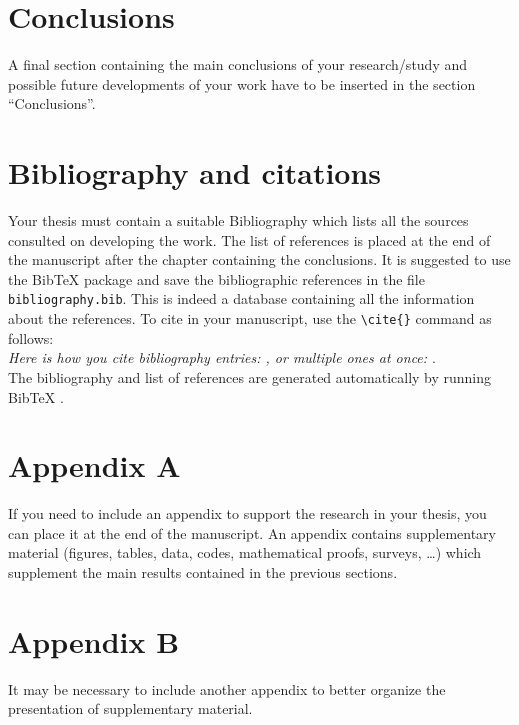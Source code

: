 \documentclass[11pt,a4paper]{article}
\begin{document}
\section{Conclusions}
\color{black}
A final section containing the main conclusions of your research/study
and possible future developments of your work have to be inserted in the section ``Conclusions''.

\section{Bibliography and citations}
Your thesis must contain a suitable Bibliography which lists all the sources consulted on developing the work.
The list of references is placed at the end of the manuscript after the chapter containing the conclusions.
It is suggested to use the BibTeX package and save the bibliographic references in the file \verb|bibliography.bib|.
This is indeed a database containing all the information about the references. To cite in your manuscript, use the \verb|\cite{}| command as follows:
\\
\textit{Here is how you cite bibliography entries: \cite{knuth74}, or multiple ones at once: \cite{knuth92,lamport94}}.
\\
The bibliography and list of references are generated automatically by running BibTeX \cite{bibtex}.



\appendix
\section{Appendix A}
If you need to include an appendix to support the research in your thesis, you can place it at the end of the manuscript.
An appendix contains supplementary material (figures, tables, data, codes, mathematical proofs, surveys, \dots)
which supplement the main results contained in the previous sections.

\section{Appendix B}
It may be necessary to include another appendix to better organize the presentation of supplementary material.
\end{document}
